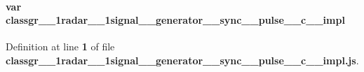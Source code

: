 \paragraph[{classgr\+\_\+1\+\_\+1radar\+\_\+1\+\_\+1signal\+\_\+\+\_\+generator\+\_\+\+\_\+sync\+\_\+\+\_\+pulse\+\_\+\+\_\+c\+\_\+\+\_\+impl}]{\setlength{\rightskip}{0pt plus 5cm}var classgr\+\_\+\_\+1radar\+\_\+\_\+1signal\+\_\+\+\_\+generator\+\_\+\+\_\+sync\+\_\+\+\_\+pulse\+\_\+\+\_\+c\+\_\+\+\_\+impl}\label{classgr__1__1radar__1__1signal____generator____sync____pulse____c____impl_8js_a282eaf12d4d301e620d0b735cd838360}


Definition at line {\bf 1} of file {\bf classgr\+\_\+\_\+1radar\+\_\+\_\+1signal\+\_\+\+\_\+generator\+\_\+\+\_\+sync\+\_\+\+\_\+pulse\+\_\+\+\_\+c\+\_\+\+\_\+impl.\+js}.

